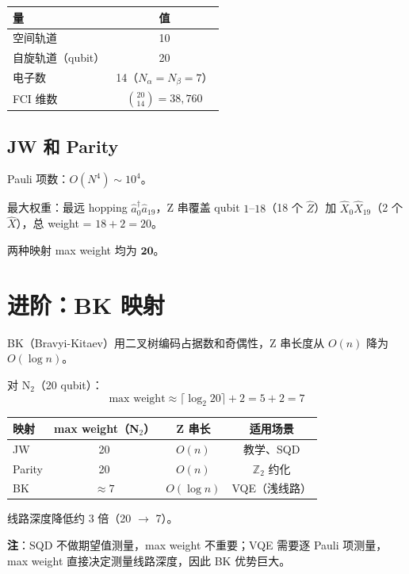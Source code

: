 \documentclass[11pt,a4paper]{article}
\begin{document}
\begin{center}
\begin{tabular}{lc}
  \toprule
  量 & 值 \\
  \midrule
  空间轨道 & 10 \\
  自旋轨道（qubit） & 20 \\
  电子数 & 14（$N_\alpha = N_\beta = 7$） \\
  FCI 维数 & $\binom{20}{14} = 38{,}760$ \\
  \bottomrule
\end{tabular}
\end{center}

\subsection{JW 和 Parity}

Pauli 项数：$O(N^4) \sim 10^4$。

最大权重：最远 hopping $\hat{a}_0^\dagger \hat{a}_{19}$，Z 串覆盖 qubit $1$--$18$（18 个 $\hat{Z}$）加 $\hat{X}_0\hat{X}_{19}$（2 个 $\hat{X}$），总 weight = $18 + 2 = 20$。

两种映射 max weight 均为 $\bm{20}$。

\section{进阶：BK 映射}

BK（Bravyi-Kitaev）用二叉树编码占据数和奇偶性，Z 串长度从 $O(n)$ 降为 $O(\log n)$。

对 N$_2$（20 qubit）：
\begin{equation}
  \text{max weight} \approx \lceil\log_2 20\rceil + 2 = 5 + 2 = 7
\end{equation}

\begin{center}
\begin{tabular}{lccc}
  \toprule
  映射 & max weight（N$_2$） & Z 串长 & 适用场景 \\
  \midrule
  JW & 20 & $O(n)$ & 教学、SQD \\
  Parity & 20 & $O(n)$ & $\mathbb{Z}_2$ 约化 \\
  BK & $\approx 7$ & $O(\log n)$ & VQE（浅线路） \\
  \bottomrule
\end{tabular}
\end{center}

线路深度降低约 3 倍（20 $\to$ 7）。

\textbf{注}：SQD 不做期望值测量，max weight 不重要；VQE 需要逐 Pauli 项测量，max weight 直接决定测量线路深度，因此 BK 优势巨大。
\end{document}
